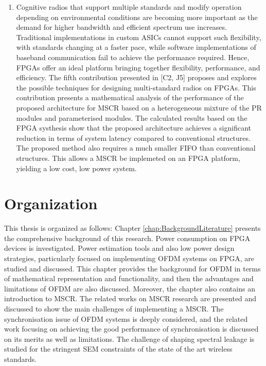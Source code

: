 \begin{enumerate}
\item Cognitive radios that support multiple standards and modify operation depending on environmental conditions are becoming more important as the demand for higher bandwidth and efficient spectrum use increases.
Traditional implementations in custom ASICs cannot support such flexibility, with standards changing at a faster pace, while software implementations of baseband communication fail to achieve the performance required.
Hence, FPGAs offer an ideal platform bringing together flexibility, performance, and efficiency.
The fifth contribution presented in [C2, J5] proposes and explores the possible techniques for designing multi-standard radios on FPGAs.
This contribution presents a mathematical analysis of the performance of the proposed architecture for MSCR based on a heterogeneous mixture of the PR modules and parameterised modules.
The calculated results based on the FPGA systhesis show that the proposed architecture achieves a significant reduction in terms of system latency compared to conventional structures.
The proposed method also requires a much smaller FIFO than conventional structures.
This allows a MSCR be implemeted on an FPGA platform, yielding a low cost, low power system.

\end{enumerate}

\section{Organization}

This thesis is organized as follows:
Chapter \ref{chap:BackgroundLiterature} presents the comprehensive background of this research.
Power consumption on FPGA devices is investigated.
Power estimation tools and also low power design strategies, particularly focused on implementing OFDM systems on FPGA, are studied and discussed.
This chapter provides the background for OFDM  in terms of mathematical representation and functionality, and then the advantages and limitations of OFDM are also discussed.
Moreover, the chapter also contains an introduction to MSCR. The related works on MSCR research are presented and discussed to show the main challenges of implementing a MSCR.
The synchronisation issue of OFDM systems is deeply considered, and the related work focusing on achieving the good performance of synchronisation is discussed on its merits as well as limitations.
The challenge of shaping spectral leakage is studied for the stringent SEM constraints of the state of the art wireless standards.

